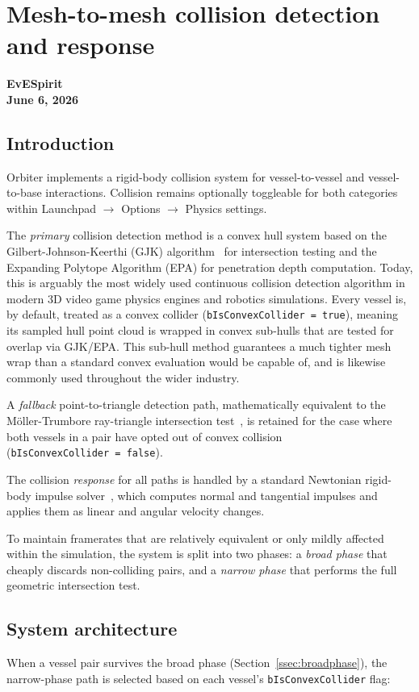 \documentclass[Orbiter Technical Reference.tex]{subfiles}
\begin{document}
\section{Mesh-to-mesh collision detection and response}
\textbf{EvESpirit}\\
\textbf{June 6, 2026}


\subsection{Introduction}
Orbiter implements a rigid-body collision system for vessel-to-vessel and
vessel-to-base interactions.
Collision remains optionally toggleable for both categories within
Launchpad $\to$ Options $\to$ Physics settings.

The \emph{primary} collision detection method is a convex hull system based
on the Gilbert-Johnson-Keerthi (GJK) algorithm~\cite{gjk1988} for
intersection testing and the Expanding Polytope Algorithm (EPA) for
penetration depth computation. Today, this is arguably the most widely used
continuous collision detection algorithm in modern 3D video game physics engines
and robotics simulations.
Every vessel is, by default, treated as a convex collider
(\texttt{bIsConvexCollider~=~true}), meaning its sampled hull point cloud
is wrapped in convex sub-hulls that are tested for overlap via GJK/EPA.
This sub-hull method guarantees a much tighter mesh wrap than a standard convex
evaluation would be capable of, and is likewise commonly used throughout
the wider industry.

A \emph{fallback} point-to-triangle detection path, mathematically
equivalent to the M\"oller-Trumbore ray-triangle intersection
test~\cite{moller1997}, is retained for the case where both vessels in a
pair have opted out of convex collision
(\texttt{bIsConvexCollider~=~false}).

The collision \emph{response} for all paths is handled by a standard
Newtonian rigid-body impulse solver~\cite{ibarra2003}, which computes
normal and tangential impulses and applies them as linear and angular
velocity changes.

To maintain framerates that are relatively equivalent or only mildly
affected within the simulation, the system is split into two phases:
a \emph{broad phase} that cheaply discards non-colliding pairs, and a
\emph{narrow phase} that performs the full geometric intersection test.


\subsection{System architecture}
\label{ssec:architecture}
When a vessel pair survives the broad phase
(Section~\ref{ssec:broadphase}), the narrow-phase path is selected
based on each vessel's \texttt{bIsConvexCollider} flag:
\end{document}
